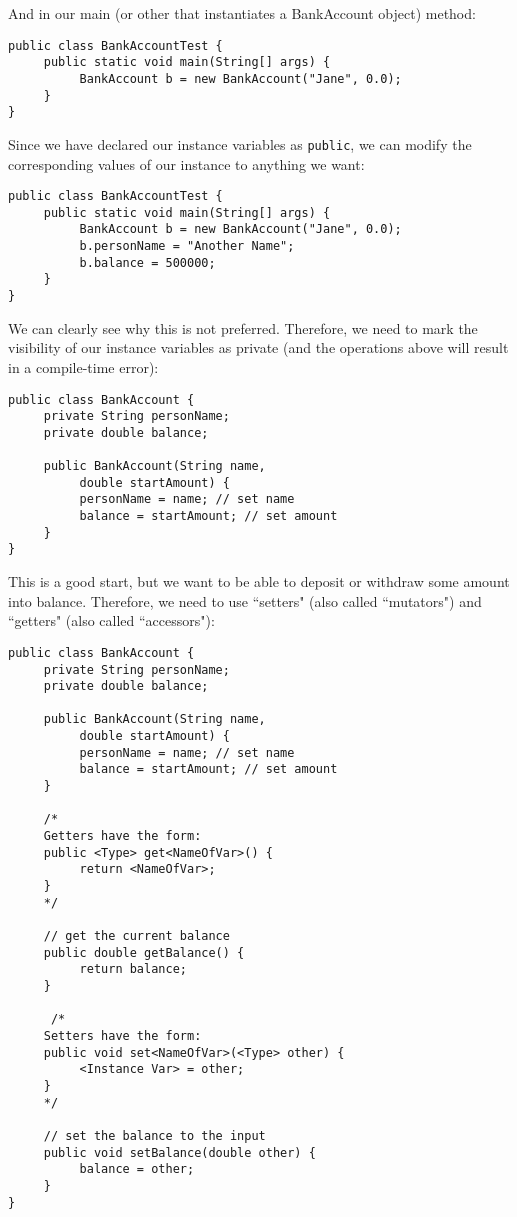 And in our main (or other that instantiates a BankAccount object) method:
\begin{lstlisting}
public class BankAccountTest {
     public static void main(String[] args) {
          BankAccount b = new BankAccount("Jane", 0.0);
     }
}
\end{lstlisting}
Since we have declared our instance variables as \verb|public|, we can modify the corresponding values of our instance to anything we want:
\begin{lstlisting}
public class BankAccountTest {
     public static void main(String[] args) {
          BankAccount b = new BankAccount("Jane", 0.0);
          b.personName = "Another Name";
          b.balance = 500000;
     }
}
\end{lstlisting}
We can clearly see why this is not preferred. Therefore, we need to mark the visibility of our instance variables as private (and the operations above will result in a compile-time error):
\begin{lstlisting}
public class BankAccount {
     private String personName;
     private double balance;
     
     public BankAccount(String name, 
          double startAmount) {
          personName = name; // set name
          balance = startAmount; // set amount
     }
}
\end{lstlisting}
This is a good start, but we want to be able to deposit or withdraw some amount into balance. Therefore, we need to use ``setters" (also called ``mutators") and ``getters" (also called ``accessors"):
\begin{lstlisting}
public class BankAccount {
     private String personName;
     private double balance;
     
     public BankAccount(String name, 
          double startAmount) {
          personName = name; // set name
          balance = startAmount; // set amount
     }
     
     /*
     Getters have the form:
     public <Type> get<NameOfVar>() {
          return <NameOfVar>;
     }
     */
     
     // get the current balance
     public double getBalance() {
          return balance;
     }
     
      /*
     Setters have the form:
     public void set<NameOfVar>(<Type> other) {
          <Instance Var> = other;
     }
     */
     
     // set the balance to the input
     public void setBalance(double other) {
          balance = other;
     }
}
\end{lstlisting}
